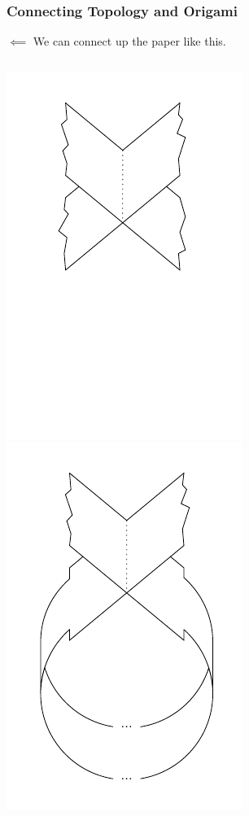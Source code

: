 \documentclass{beamer}
\begin{document}
\begin{frame}
\frametitle{Connecting Topology and Origami}
\begin{block}{$\impliedby$}
We can connect up the paper like this. 
\end{block}
\begin{columns}[c]
\includegraphics[width=.7\textwidth]{knot_pix/finding-ribbon_1.pdf}
\includegraphics[width=.7\textwidth]{knot_pix/finding-ribbon_2.pdf}
\end{columns}
\end{frame}
\end{document}
